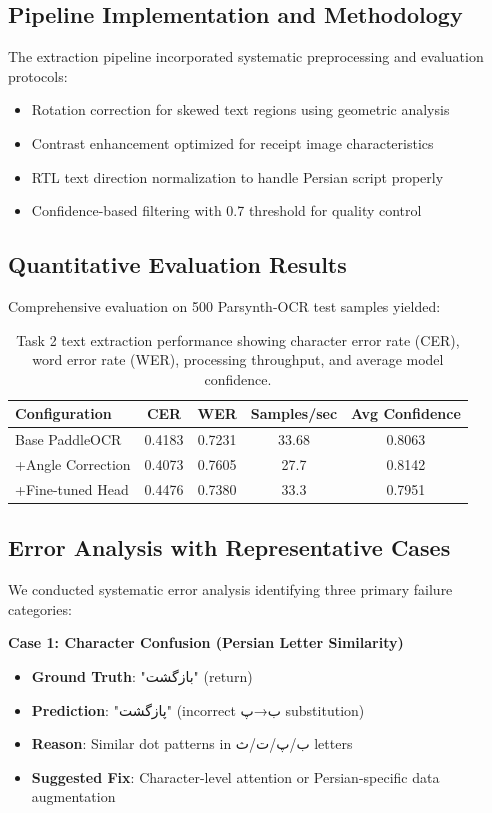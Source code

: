 \documentclass[11pt,a4paper]{article}
\begin{document}
\subsection{Pipeline Implementation and Methodology}
The extraction pipeline incorporated systematic preprocessing and evaluation protocols:
\begin{itemize}
  \item Rotation correction for skewed text regions using geometric analysis
  \item Contrast enhancement optimized for receipt image characteristics
  \item RTL text direction normalization to handle Persian script properly
  \item Confidence-based filtering with 0.7 threshold for quality control
\end{itemize}

\subsection{Quantitative Evaluation Results}
Comprehensive evaluation on 500 Parsynth-OCR test samples yielded:

\begin{table}[h]
  \centering
  \begin{tabular*}{\textwidth}{@{\extracolsep{\fill}}lcccc@{}}
    \toprule
    Configuration & CER & WER & Samples/sec & Avg Confidence \\
    \midrule
    Base PaddleOCR & 0.4183 & 0.7231 & 33.68 & 0.8063 \\
    +Angle Correction & 0.4073 & 0.7605 & 27.7 & 0.8142 \\
    +Fine-tuned Head & 0.4476 & 0.7380 & 33.3 & 0.7951 \\
    \bottomrule
  \end{tabular*}
  \caption{Task 2 text extraction performance showing character error rate (CER), word error rate (WER), processing throughput, and average model confidence.}
  \label{tab:task2-results}
\end{table}

\subsection{Error Analysis with Representative Cases}
We conducted systematic error analysis identifying three primary failure categories:

\textbf{Case 1: Character Confusion (Persian Letter Similarity)}
\begin{itemize}
  \item \textbf{Ground Truth}: "بازگشت" (return)
  \item \textbf{Prediction}: "پازگشت" (incorrect ب→پ substitution)
  \item \textbf{Reason}: Similar dot patterns in ب/پ/ت/ث letters
  \item \textbf{Suggested Fix}: Character-level attention or Persian-specific data augmentation
\end{itemize}
\end{document}
